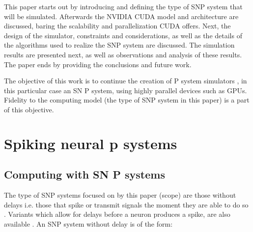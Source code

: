\documentclass{svmultm}
\begin{document}
This paper starts out by introducing and defining the type of SNP system that will be simulated. Afterwards the NVIDIA CUDA model and architecture are discussed, baring the scalability and parallelization CUDA offers. Next, the design of the simulator, constraints and considerations, as well as the details of the algorithms used to realize the SNP system are discussed. The simulation results are presented next, as well as observations and analysis of these results. The paper ends by providing the conclusions and future work.

The objective of this work is to continue the creation of P system simulators 
, in this particular case an SN P system, using highly parallel devices such as  {GPUs}. Fidelity to the computing model (the type of SNP system in this paper) is a part of this objective.


\section{Spiking neural p systems}

\subsection{Computing with SN P systems}\label{computesnp}
The type of SNP systems focused on by this paper (scope) are those without delays i.e. those that spike or transmit signals the moment they are able to do so \cite{snpbrain,snpmat}. Variants which allow for delays before a neuron produces a spike, are also available \cite{snp}. An SNP system without delay is of the form:
\end{document}
